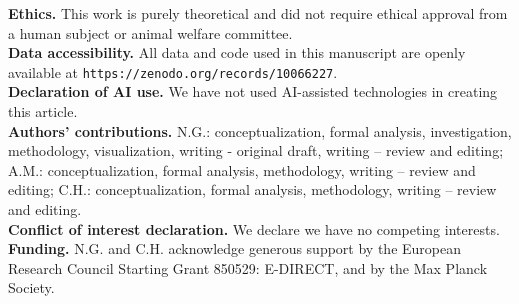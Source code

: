 \documentclass[11pt]{article}
\theoremstyle{plainCl1}
\theoremstyle{plainCl2}
\begin{document}

\noindent
{\bf Ethics.}
This work is purely theoretical and did not require ethical approval from a human subject or animal welfare committee.\\

\noindent
{\bf Data accessibility.}
All data and code used in this manuscript are openly available at\newline
\texttt{https://zenodo.org/records/10066227}.\\

\noindent
{\bf Declaration of AI use.}
We have not used AI-assisted technologies in creating this article.\\

\noindent
{\bf Authors' contributions.}
N.G.: conceptualization, formal analysis, investigation, methodology, visualization, writing - original draft, writing -- review and editing; 
A.M.: conceptualization, formal analysis, methodology, writing -- review and editing; 
C.H.: conceptualization, formal analysis, methodology, writing -- review and editing.\\

\noindent
{\bf Conflict of interest declaration.}
We declare we have no competing interests.\\

\noindent
{\bf Funding.}
N.G. and C.H. acknowledge generous support by the European Research Council Starting Grant 850529:
E-DIRECT, and by the Max Planck Society.\\



\end{document}
